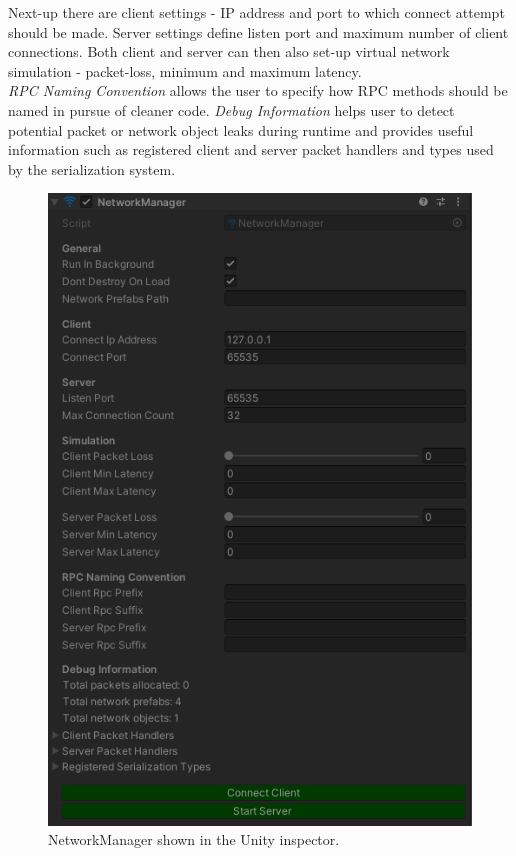 \documentclass[times, utf8, diplomski]{fer}
\begin{document}
Next-up there are client settings - IP address and port to which connect attempt should be made. Server settings define listen port and maximum number of client connections. Both client and server can then also set-up virtual network simulation - packet-loss, minimum and maximum latency.\\

\textit{RPC Naming Convention} allows the user to specify how RPC methods should be named in pursue of cleaner code. \textit{Debug Information} helps user to detect potential packet or network object leaks during runtime and provides useful information such as registered client and server packet handlers and types used by the serialization system.

\begin{figure}[H]
	\centering
	\includegraphics[scale=0.85]{NetworkManager-inspector}
	\caption{NetworkManager shown in the Unity inspector.}
	\label{fig:network-manager-inspector}
\end{figure}
\end{document}
